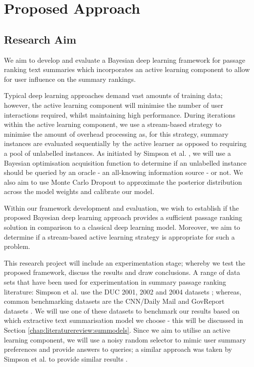 \documentclass[ %
                    author={James Stephenson},
                supervisor={Dr. Edwin Simpson},
                    degree={MSc},
                     title={PROJECT PLAN},
                  subtitle={Bayesian Deep Learning For Extractive Test Summarisation},
                      type={},
                      year={2022}]{../additions/dissertation}
\begin{document}
		\section{Proposed Approach}
		\label{chap:introduction:prop_approach}
		
			\subsection{Research Aim}
			\label{chap:introduction:prop_approach:aim}
			
				We aim to develop and evaluate a Bayesian deep learning framework for passage ranking text summaries which incorporates an active learning component to allow for user influence on the summary rankings.
				
				\medbreak
				Typical deep learning approaches demand vast amounts of training data; however, the active learning component will minimise the number of user interactions required, whilst maintaining high performance. During iterations within the active learning component, we use a stream-based strategy to minimise the amount of overhead processing as, for this strategy, summary instances are evaluated sequentially by the active learner as opposed to requiring a pool of unlabelled instances. As initiated by Simpson et al. \cite{Simpson19}, we will use a Bayesian optimisation acquisition function to determine if an unlabelled instance should be queried by an oracle - an all-knowing information source - or not. We also aim to use Monte Carlo Dropout \cite{Gal15} to approximate the posterior distribution across the model weights and calibrate our model.

				\medbreak
				Within our framework development and evaluation, we wish to establish if the proposed Bayesian deep learning approach provides a sufficient passage ranking solution in comparison to a classical deep learning model. Moreover, we aim to determine if a stream-based active learning strategy is appropriate for such a problem.
				
				\medbreak
				This research project will include an experimentation stage; whereby we test the proposed framework, discuss the results and draw conclusions. A range of data sets that have been used for experimentation in summary passage ranking literature: Simpson et al. use the DUC 2001, 2002 and 2004 datasets \cite{Simpson19}; whereas, common benchmarking datasets are the CNN/Daily Mail and GovReport datasets \cite{Nallapati16, Huang21}. We will use one of these datasets to benchmark our results based on which extractive text summarisation model we choose - this will be discussed in Section \ref{chap:literaturereview:summodels}. Since we aim to utilise an active learning component, we will use a noisy random selector to mimic user summary preferences and provide answers to queries; a similar approach was taken by Simpson et al. to provide similar results \cite{Simpson19}.
				
\end{document}
